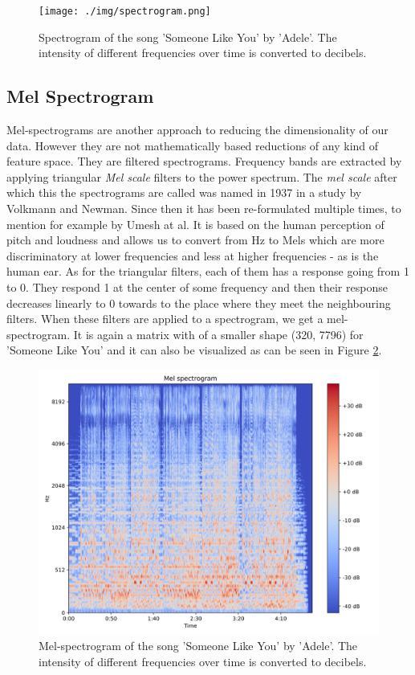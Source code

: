 \begin{figure}[h!]
    \centering
	\texttt{[image: ./img/spectrogram.png]}
	\caption{Spectrogram of the song 'Someone Like You' by 'Adele'. The intensity of different frequencies over time is converted to decibels.}
	\label{fig:ilustrative_specrogram}
\end{figure}


\subsection{Mel Spectrogram}\label{ssec:mel_spectrograms_intro}
Mel-spectrograms are another approach to reducing the dimensionality of our data. However they are not mathematically based reductions of any kind of feature space. They are filtered spectrograms. Frequency bands are extracted by applying triangular \textit{Mel scale} filters to the power spectrum. The \textit{mel scale} after which this the spectrograms are called was named in 1937 in a study \cite{1937ASAJ....8..185S} by Volkmann and Newman. Since then it has been re-formulated multiple times, to mention for example \cite{mel_scale_fit} by Umesh at al. It is based on the human perception of pitch and loudness and allows us to convert from Hz to Mels which are more discriminatory at lower frequencies and less at higher frequencies - as is the human ear. As for the triangular filters, each of them has a response going from 1 to 0. They respond 1 at the center of some frequency and then their response decreases linearly to 0 towards to the place where they meet the neighbouring filters. When these filters are applied to a spectrogram, we get a mel-spectrogram. It is again a matrix with of a smaller shape (320, 7796) for 'Someone Like You' and it can also be visualized as can be seen in Figure \ref{fig:ilustrative_melspecrogram}.

\begin{figure}[h!]
    \centering
	\includegraphics[width=140mm]{./img/melspectrogram.png}
	\caption{Mel-spectrogram of the song 'Someone Like You' by 'Adele'. The intensity of different frequencies over time is converted to decibels.}
	\label{fig:ilustrative_melspecrogram}
\end{figure}

